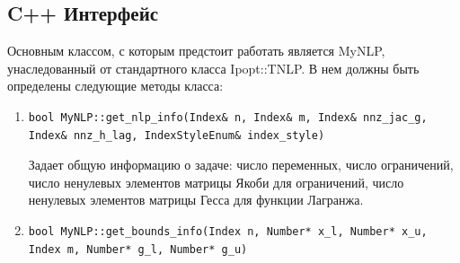 \documentclass[14pt,fleqn,a4paper]{scrartcl}
\begin{document}
\subsection{C++ Интерфейс}
Основным классом, с которым предстоит работать является MyNLP, унаследованный от стандартного класса Ipopt::TNLP. В нем должны быть определены следующие методы класса:
\begin{enumerate}
\item 
\begin{verbatim}bool MyNLP::get_nlp_info(Index& n, Index& m, Index& nnz_jac_g,
Index& nnz_h_lag, IndexStyleEnum& index_style)
\end{verbatim}

Задает общую информацию о задаче: число переменных, число ограничений, число ненулевых элементов матрицы Якоби для ограничений, число ненулевых элементов матрицы Гесса для функции Лагранжа.
\item 
\begin{verbatim}
bool MyNLP::get_bounds_info(Index n, Number* x_l, Number* x_u,
Index m, Number* g_l, Number* g_u)
\end{verbatim}


\end{enumerate}
\end{document}
